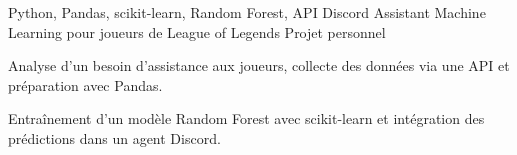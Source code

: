 
\begin{cventries}
  \cventry
    {Python, Pandas, scikit-learn, Random Forest, API Discord}
    {Assistant Machine Learning pour joueurs de League of Legends}
    {Projet personnel}
    {}
    {
      \begin{cvitems}
        \item {Analyse d’un besoin d’assistance aux joueurs, collecte des données via une API et préparation avec Pandas.}
        \item {Entraînement d’un modèle Random Forest avec scikit-learn et intégration des prédictions dans un agent Discord.}
      \end{cvitems}
    }
\end{cventries}
